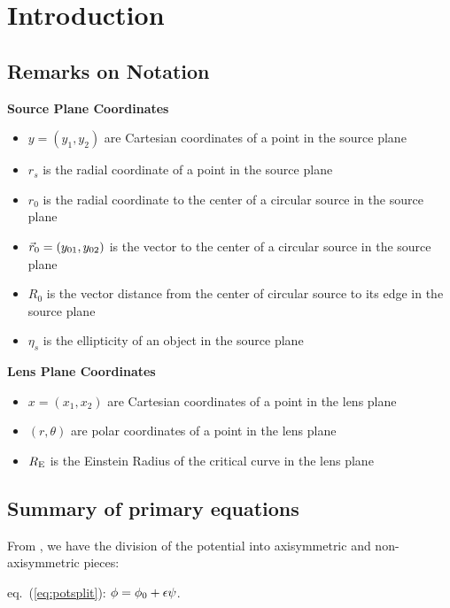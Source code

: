 \chapter{Introduction}

\section{Remarks on Notation}

{\bf Source Plane Coordinates}
\begin{itemize}
\item{ $ y = (y_1, y_2) $ are Cartesian coordinates of a point in the source plane}
\item{   $r_s $ is the radial coordinate of a point in the source plane}
\item{   $r_0 $ is the radial coordinate to the center of a circular source in the source plane}

\item{   $\vec{r}_0 =(y_{01},y_{02})$ is the vector to the center of a circular source in the source plane}

\item{ $R_0 $ is the vector distance from the center of circular
  source to its edge in the source plane}

\item{ $\eta_s$ is the ellipticity of an object in the source plane}

\end{itemize}

{\bf Lens Plane Coordinates}

\begin{itemize}
\item{ $ x = (x_1, x_2) $ are Cartesian coordinates of a point in the lens plane}
\item{ $  (r, \theta) $ are polar coordinates of a point in the lens plane}
\item{ $R_{\mathrm{E}}$ is the Einstein Radius of the critical curve in the lens plane}
\end{itemize}



\section{Summary of primary equations}

From , we have the division of the potential into
axisymmetric and non-axisymmetric pieces:

eq.~(\ref{eq:potsplit}): $\phi  =  \phi_0 + \epsilon \psi$.

